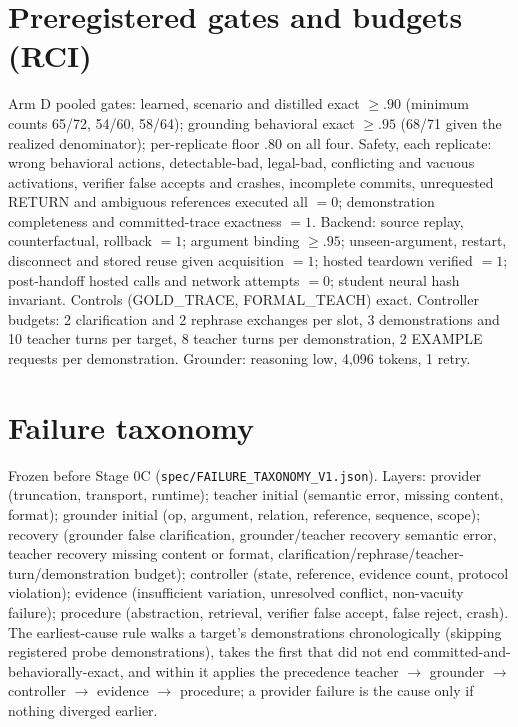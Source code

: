 \documentclass[10pt]{article}
\newcommand{\id}[1]{\nolinkurl{#1}}
\begin{document}
\section{Preregistered gates and budgets (RCI)}\label{app:gates}
Arm D pooled gates: learned, scenario and distilled exact $\ge .90$ (minimum counts 65/72, 54/60, 58/64); grounding behavioral exact $\ge .95$ (68/71 given the realized denominator); per-replicate floor .80 on all four. Safety, each replicate: wrong behavioral actions, detectable-bad, legal-bad, conflicting and vacuous activations, verifier false accepts and crashes, incomplete commits, unrequested RETURN and ambiguous references executed all $=0$; demonstration completeness and committed-trace exactness $=1$. Backend: source replay, counterfactual, rollback $=1$; argument binding $\ge .95$; unseen-argument, restart, disconnect and stored reuse given acquisition $=1$; hosted teardown verified $=1$; post-handoff hosted calls and network attempts $=0$; student neural hash invariant. Controls (GOLD\_TRACE, FORMAL\_TEACH) exact. Controller budgets: 2 clarification and 2 rephrase exchanges per slot, 3 demonstrations and 10 teacher turns per target, 8 teacher turns per demonstration, 2 EXAMPLE requests per demonstration. Grounder: reasoning low, 4{,}096 tokens, 1 retry.

\section{Failure taxonomy}\label{app:taxonomy}
Frozen before Stage 0C (\id{spec/FAILURE_TAXONOMY_V1.json}). Layers: provider (truncation, transport, runtime); teacher initial (semantic error, missing content, format); grounder initial (op, argument, relation, reference, sequence, scope); recovery (grounder false clarification, grounder/teacher recovery semantic error, teacher recovery missing content or format, clarification/rephrase/teacher-turn/demonstration budget); controller (state, reference, evidence count, protocol violation); evidence (insufficient variation, unresolved conflict, non-vacuity failure); procedure (abstraction, retrieval, verifier false accept, false reject, crash). The earliest-cause rule walks a target's demonstrations chronologically (skipping registered probe demonstrations), takes the first that did not end committed-and-behaviorally-exact, and within it applies the precedence teacher $\rightarrow$ grounder $\rightarrow$ controller $\rightarrow$ evidence $\rightarrow$ procedure; a provider failure is the cause only if nothing diverged earlier.
\end{document}
